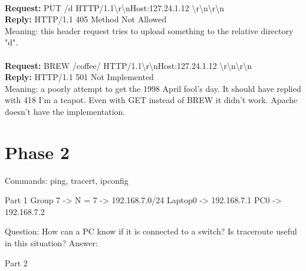 \documentclass[11pt,a4paper]{report}
\begin{document}
        \\
        \textbf{Request:} PUT /d HTTP/1.1\textbackslash r\textbackslash nHost:127.24.1.12 \textbackslash r\textbackslash n\textbackslash r\textbackslash n \\
        \textbf{Reply:} HTTP/1.1 405 Method Not Allowed \\
        Meaning: this header request tries to upload something to the relative directory "d". \\
        \\
        \textbf{Request:} BREW /coffee/ HTTP/1.1\textbackslash r\textbackslash nHost:127.24.1.12 \textbackslash r\textbackslash n\textbackslash r\textbackslash n \\
        \textbf{Reply:} HTTP/1.1 501 Not Implemented \\
        Meaning: a poorly attempt to get the 1998 April fool's day. It should have replied with 418 I'm a teapot. Even with GET instead of BREW it didn't work. Apache doesn't have the implementation. \\

\chapter{Phase 2}
Commands: ping, tracert, ipconfig

Part 1
Group 7 -> N = 7 -> 192.168.7.0/24
Laptop0 -> 192.168.7.1
PC0     -> 192.168.7.2

Question: How can a PC know if it is connected to a switch? Is traceroute useful in this situation?
Answer: 


Part 2
        
\end{document}
